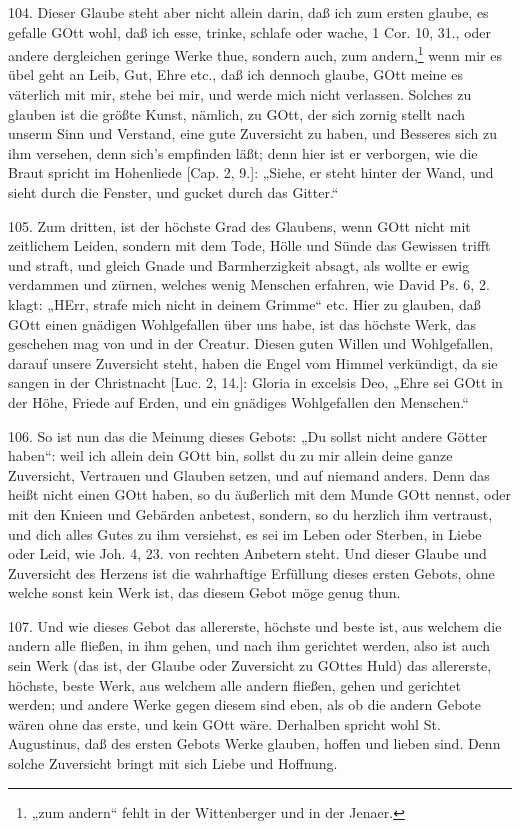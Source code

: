 104. Dieser Glaube steht aber nicht allein darin, daß ich zum ersten glaube, es gefalle GOtt wohl, daß ich esse, trinke, schlafe oder wache, 1 Cor. 10, 31., oder andere dergleichen geringe Werke thue, sondern auch, zum andern,\footnote{„zum andern“ fehlt in der Wittenberger und in der Jenaer.} wenn mir es übel geht an Leib, Gut, Ehre etc., daß ich dennoch glaube, GOtt meine es väterlich mit mir, stehe bei mir, und werde mich nicht verlassen. Solches zu glauben ist die größte Kunst, nämlich, zu GOtt, der sich zornig stellt nach unserm Sinn und Verstand, eine gute Zuversicht zu haben, und Besseres sich zu ihm versehen, denn sich’s empfinden läßt; denn hier ist er verborgen, wie die Braut spricht im Hohenliede [Cap. 2, 9.]: „Siehe, er steht hinter der Wand, und sieht durch die Fenster, und gucket durch das Gitter.“

105. Zum dritten, ist der höchste Grad des Glaubens, wenn GOtt nicht mit zeitlichem Leiden, sondern mit dem Tode, Hölle und Sünde das Gewissen trifft und straft, und gleich Gnade und Barmherzigkeit absagt, als wollte er ewig verdammen und zürnen, welches wenig Menschen erfahren, wie David Ps. 6, 2. klagt: „HErr, strafe mich nicht in deinem Grimme“ etc. Hier zu glauben, daß GOtt einen gnädigen Wohlgefallen über uns habe, ist das höchste Werk,
das geschehen mag von und in der Creatur. Diesen guten Willen und Wohlgefallen, darauf unsere Zuversicht steht, haben die Engel vom Himmel verkündigt, da sie sangen in der Christnacht [Luc. 2, 14.]: Gloria in excelsis Deo, „Ehre sei GOtt in der Höhe, Friede auf Erden, und ein gnädiges Wohlgefallen den Menschen.“

106. So ist nun das die Meinung dieses Gebots: „Du sollst nicht andere Götter haben“: weil ich allein dein GOtt bin, sollst du zu mir allein deine ganze Zuversicht, Vertrauen und Glauben setzen, und auf niemand anders. Denn das heißt nicht einen GOtt haben, so du äußerlich mit dem Munde GOtt nennst, oder mit den Knieen und Gebärden anbetest, sondern, so du herzlich ihm vertraust, und dich alles Gutes zu ihm versiehst, es sei im Leben oder Sterben, in Liebe oder Leid, wie Joh. 4, 23. von rechten Anbetern steht. Und dieser Glaube und Zuversicht des Herzens ist die wahrhaftige Erfüllung dieses ersten Gebots, ohne welche sonst kein Werk ist, das diesem Gebot möge genug thun.

107. Und wie dieses Gebot das allererste, höchste und beste ist, aus welchem die andern alle fließen, in ihm gehen, und nach ihm gerichtet werden, also ist auch sein Werk (das ist, der Glaube oder Zuversicht zu GOttes Huld) das allererste, höchste, beste Werk, aus welchem alle andern fließen, gehen und gerichtet werden; und andere Werke gegen diesem sind eben, als ob die andern Gebote wären ohne das erste, und kein GOtt wäre. Derhalben spricht wohl St. Augustinus, daß des ersten Gebots Werke glauben, hoffen und lieben sind. Denn solche Zuversicht bringt mit sich Liebe und Hoffnung.

